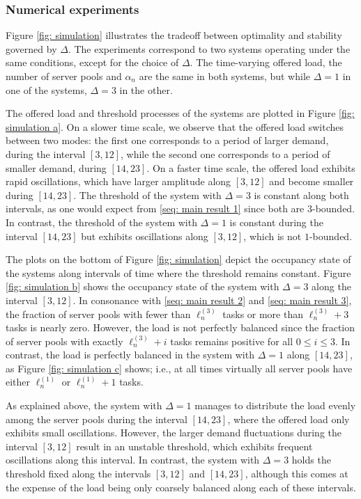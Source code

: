 \documentclass[a4paper, 12pt]{article}
\theoremstyle{definition}
\begin{document}
\subsubsection{Numerical experiments}
\label{sub: numerical experiments}

Figure \ref{fig: simulation} illustrates the tradeoff between optimality and stability governed by $\Delta$. The experiments correspond to two systems operating under the same conditions, except for the choice of $\Delta$. The time-varying offered load, the number of server pools and $\alpha_n$ are the same in both systems, but while $\Delta = 1$ in one of the systems, $\Delta = 3$ in the other.

The offered load and threshold processes of the systems are plotted in Figure \ref{fig: simulation a}. On a slower time scale, we observe that the offered load switches between two modes: the first one corresponds to a period of larger demand, during the interval $[3, 12]$, while the second one corresponds to a period of smaller demand, during $[14, 23]$. On a faster time scale, the offered load exhibits rapid oscillations, which have larger amplitude along $[3, 12]$ and become smaller during $[14, 23]$. The threshold of the system with $\Delta = 3$ is constant along both intervals, as one would expect from \eqref{seq: main result 1} since both are $3$-bounded. In contrast, the threshold of the system with $\Delta = 1$ is constant during the interval $[14, 23]$ but exhibits oscillations along $[3, 12]$, which is not $1$-bounded.

The plots on the bottom of Figure \ref{fig: simulation} depict the occupancy state of the systems along intervals of time where the threshold remains constant. Figure \ref{fig: simulation b} shows the occupancy state of the system with $\Delta = 3$ along the interval $[3, 12]$. In consonance with \eqref{seq: main result 2} and \eqref{seq: main result 3}, the fraction of server pools with fewer than $\ell_n^{(3)}$ tasks or more than $\ell_n^{(3)} + 3$ tasks is nearly zero. However, the load is not perfectly balanced since the fraction of server pools with exactly $\ell_n^{(3)} + i$ tasks remains positive for all $0 \leq i \leq 3$. In contrast, the load is perfectly balanced in the system with $\Delta = 1$ along $[14, 23]$, as Figure \ref{fig: simulation c} shows; i.e., at all times virtually all server pools have either $\ell_n^{(1)}$ or $\ell_n^{(1)} + 1$ tasks.

As explained above, the system with $\Delta = 1$ manages to distribute the load evenly among the server pools during the interval $[14, 23]$, where the offered load only exhibits small oscillations. However, the larger demand fluctuations during the interval $[3, 12]$ result in an unstable threshold, which exhibits frequent oscillations along this interval. In contrast, the system with $\Delta = 3$ holds the threshold fixed along the intervals $[3, 12]$ and $[14, 23]$, although this comes at the expense of the load being only coarsely balanced along each of these intervals.
\end{document}
